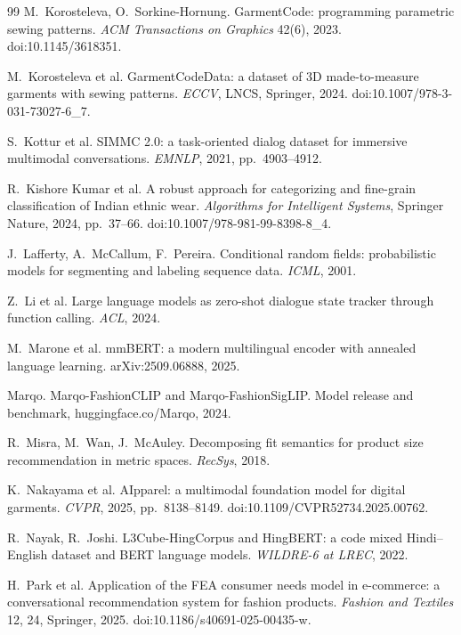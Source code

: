 \begin{thebibliography}{99}
 M.~Korosteleva, O.~Sorkine-Hornung. GarmentCode: programming parametric sewing patterns. \emph{ACM Transactions on Graphics} 42(6), 2023. doi:10.1145/3618351.

 M.~Korosteleva et al. GarmentCodeData: a dataset of 3D made-to-measure garments with sewing patterns. \emph{ECCV}, LNCS, Springer, 2024. doi:10.1007/978-3-031-73027-6\_7.

 S.~Kottur et al. SIMMC 2.0: a task-oriented dialog dataset for immersive multimodal conversations. \emph{EMNLP}, 2021, pp.~4903--4912.

 R.~Kishore Kumar et al. A robust approach for categorizing and fine-grain classification of Indian ethnic wear. \emph{Algorithms for Intelligent Systems}, Springer Nature, 2024, pp.~37--66. doi:10.1007/978-981-99-8398-8\_4.

 J.~Lafferty, A.~McCallum, F.~Pereira. Conditional random fields: probabilistic models for segmenting and labeling sequence data. \emph{ICML}, 2001.

 Z.~Li et al. Large language models as zero-shot dialogue state tracker through function calling. \emph{ACL}, 2024.

 M.~Marone et al. mmBERT: a modern multilingual encoder with annealed language learning. arXiv:2509.06888, 2025.

 Marqo. Marqo-FashionCLIP and Marqo-FashionSigLIP. Model release and benchmark, huggingface.co/Marqo, 2024.

 R.~Misra, M.~Wan, J.~McAuley. Decomposing fit semantics for product size recommendation in metric spaces. \emph{RecSys}, 2018.

 K.~Nakayama et al. AIpparel: a multimodal foundation model for digital garments. \emph{CVPR}, 2025, pp.~8138--8149. doi:10.1109/CVPR52734.2025.00762.

 R.~Nayak, R.~Joshi. L3Cube-HingCorpus and HingBERT: a code mixed Hindi--English dataset and BERT language models. \emph{WILDRE-6 at LREC}, 2022.

 H.~Park et al. Application of the FEA consumer needs model in e-commerce: a conversational recommendation system for fashion products. \emph{Fashion and Textiles} 12, 24, Springer, 2025. doi:10.1186/s40691-025-00435-w.


\end{thebibliography}
